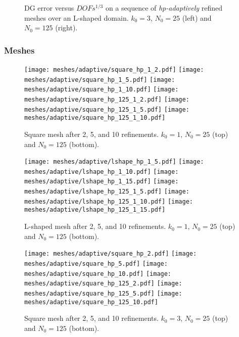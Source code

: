 \begin{figure}[!ht]
    \begin{subfigure}[b]{0.45\textwidth}
		
	\end{subfigure}
	\hfill
	\begin{subfigure}[b]{0.45\textwidth}
		
	\end{subfigure}
    \caption{DG error versus $DOFs^{1/3}$ on a sequence of \textit{hp-adaptively} refined meshes over an L-shaped domain. $k_0 = 3$, $N_0 = 25$ (left) and $N_0 = 125$ (right).}
\end{figure}

\newpage
\subsubsection{Meshes}

\begin{figure}[!ht]
	\centering
    \texttt{[image: meshes/adaptive/square\_hp\_1\_2.pdf]}
	\texttt{[image: meshes/adaptive/square\_hp\_1\_5.pdf]}
	\texttt{[image: meshes/adaptive/square\_hp\_1\_10.pdf]}
    \texttt{[image: meshes/adaptive/square\_hp\_125\_1\_2.pdf]}
	\texttt{[image: meshes/adaptive/square\_hp\_125\_1\_5.pdf]}
	\texttt{[image: meshes/adaptive/square\_hp\_125\_1\_10.pdf]}
    \caption{Square mesh after 2, 5, and 10 refinements. $k_0 = 1$, $N_0 = 25$ (top) and $N_0 = 125$ (bottom).}
\end{figure}

\begin{figure}[!ht]
	\centering
	\texttt{[image: meshes/adaptive/lshape\_hp\_1\_5.pdf]}
	\texttt{[image: meshes/adaptive/lshape\_hp\_1\_10.pdf]}
	\texttt{[image: meshes/adaptive/lshape\_hp\_1\_15.pdf]}
    \texttt{[image: meshes/adaptive/lshape\_hp\_125\_1\_5.pdf]}
	\texttt{[image: meshes/adaptive/lshape\_hp\_125\_1\_10.pdf]}
	\texttt{[image: meshes/adaptive/lshape\_hp\_125\_1\_15.pdf]}
    \caption{L-shaped mesh after 2, 5, and 10 refinements. $k_0 = 1$, $N_0 = 25$ (top) and $N_0 = 125$ (bottom).}
\end{figure}

\newpage

\begin{figure}[!ht]
	\centering
    \texttt{[image: meshes/adaptive/square\_hp\_2.pdf]}
	\texttt{[image: meshes/adaptive/square\_hp\_5.pdf]}
	\texttt{[image: meshes/adaptive/square\_hp\_10.pdf]}
    \texttt{[image: meshes/adaptive/square\_hp\_125\_2.pdf]}
	\texttt{[image: meshes/adaptive/square\_hp\_125\_5.pdf]}
	\texttt{[image: meshes/adaptive/square\_hp\_125\_10.pdf]}
	\caption{Square mesh after 2, 5, and 10 refinements. $k_0 = 3$, $N_0 = 25$ (top) and $N_0 = 125$ (bottom).}
\end{figure}

